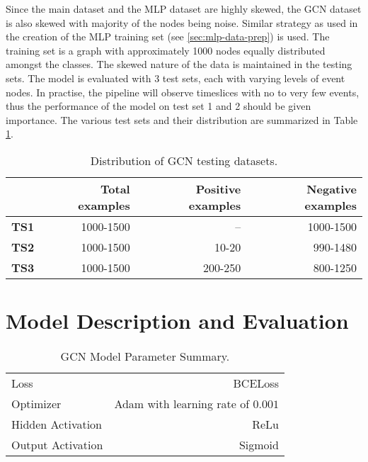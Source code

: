 Since the main dataset and the MLP dataset are highly skewed, the GCN
dataset is also skewed with majority of the nodes being noise. Similar
strategy as used in the creation of the MLP training set (see
\ref{sec:mlp-data-prep}) is used. The training set is a graph with
approximately 1000 nodes equally distributed amongst the classes. The
skewed nature of the data is maintained in the testing sets. The model
is evaluated with 3 test sets, each with varying levels of event
nodes. In practise, the pipeline will observe timeslices with no to
very few events, thus the performance of the model on test set 1 and 2
should be given importance. The various test sets and their
distribution are summarized in Table \ref{tab:gcn-test-dist}.

\begin{table}[htb]
  \centering
  \caption{Distribution of GCN testing datasets.}
  \begin{tabular}{lrrr}
    \hline
    & Total examples & Positive examples & Negative examples \\
    \hline
    \textbf{TS1} & 1000-1500 & -- & 1000-1500 \\
    \textbf{TS2} & 1000-1500 & 10-20 & 990-1480 \\
    \textbf{TS3} & 1000-1500 & 200-250 & 800-1250 \\
    \hline
  \end{tabular}
  \label{tab:gcn-test-dist}
\end{table}

\section{Model Description and Evaluation}
\label{sec:gcn-model-desc-eval}

\begin{table}[htb]
  \centering
  \caption{GCN Model Parameter Summary.}
  \begin{tabular}{lr}
    \hline
    Loss & BCELoss \\
    Optimizer & Adam with learning rate of $0.001$ \\
    Hidden Activation & ReLu \\
    Output Activation & Sigmoid \\
    \hline
  \end{tabular}
  \label{tab:gcn-model-param}
\end{table}

